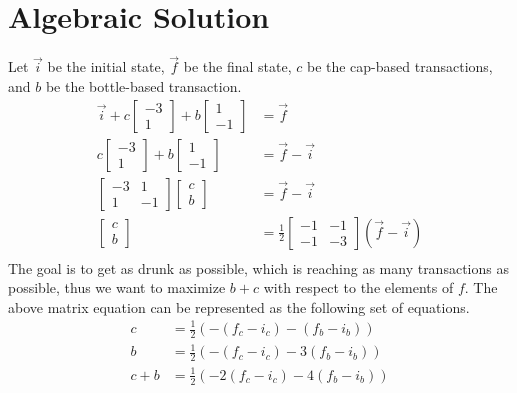\documentclass[letterpaper, 12pt]{article}
\begin{document}
\section{Algebraic Solution}
Let $\vec{i}$ be the initial state, $\vec{f}$ be the final state, $c$ be the cap-based transactions, and $b$ be the bottle-based transaction.
\begin{align*}
    \vec{i}
    + c
    \begin{bmatrix}
        -3\\
        1
    \end{bmatrix}
    + b
    \begin{bmatrix}
        1\\
        -1
    \end{bmatrix}
    &=
    \vec{f}\\
    c
    \begin{bmatrix}
        -3\\
        1
    \end{bmatrix}
    + b
    \begin{bmatrix}
        1\\
        -1
    \end{bmatrix}
    &=
    \vec{f} - \vec{i}\\
    \begin{bmatrix}
        -3 & 1\\
         1 &-1
    \end{bmatrix}
    \begin{bmatrix}
        c\\
        b
    \end{bmatrix}
    &=
    \vec{f} - \vec{i}\\
    \begin{bmatrix}
        c\\
        b
    \end{bmatrix}
    &=
    \frac{1}{2}
    \begin{bmatrix}
        -1 &-1\\
        -1 &-3
    \end{bmatrix}
    (\vec{f} - \vec{i})\\
\end{align*}
The goal is to get as drunk as possible, which is reaching as many transactions as possible, thus we want to maximize $b + c$ with respect to the elements of $f$.
The above matrix equation can be represented as the following set of equations.
\begin{align*}
    c &= \frac{1}{2}(-(f_c - i_c) - (f_b - i_b))\\
    b &= \frac{1}{2}(-(f_c - i_c) - 3(f_b - i_b))\\
    c + b &= \frac{1}{2}(-2(f_c - i_c) - 4(f_b - i_b))
\end{align*}
\end{document}
